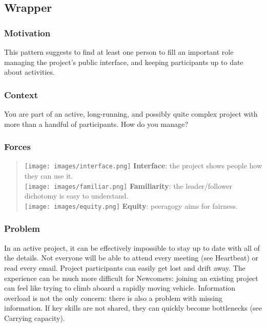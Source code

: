\hypertarget{wrapper}{%
\subsection{Wrapper}\label{wrapper}}

\hypertarget{motivation}{%
\subsubsection{Motivation}\label{motivation}}

This pattern suggests to find at least one person to fill an important
role managing the project's public interface, and keeping participants
up to date about activities.

\hypertarget{context}{%
\subsubsection{Context}\label{context}}

You are part of an active, long-running, and possibly quite complex
project with more than a handful of participants. How do you manage?

\hypertarget{forces}{%
\subsubsection{Forces}\label{forces}}

\begin{quote}
\texttt{[image: images/interface.png]} \textbf{Interface}: the project
shows people how they can use it.\\
\texttt{[image: images/familiar.png]} \textbf{Familiarity}: the
leader/follower dichotomy is easy to understand.\\
\texttt{[image: images/equity.png]} \textbf{Equity}: peeragogy aims for
fairness.
\end{quote}

\hypertarget{problem}{%
\subsubsection{Problem}\label{problem}}

In an active project, it can be effectively impossible to stay up to
date with all of the details. Not everyone will be able to attend every
meeting (see {{Heartbeat}}) or read every email. Project participants
can easily get lost and drift away. The experience can be much more
difficult for {{Newcomers}}: joining an existing project can feel like
trying to climb aboard a rapidly moving vehicle. Information overload is
not the only concern: there is also a problem with missing information.
If key skills are not shared, they can quickly become bottlenecks (see
{{Carrying capacity}}).

